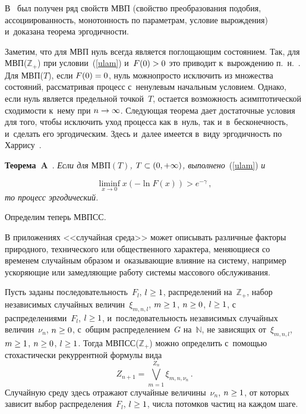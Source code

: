\begin{multicols}{2}
В~\cite{Leb-2005d} был получен ряд свойств МВП (свойство преобразования подобия,
ассоциированность, монотонность по па\-ра\-мет\-рам, условие вырождения)
и~доказана тео\-ре\-ма эргодичности.

Заметим, что для МВП нуль всегда является
по\-гло\-ща\-ющим со\-сто\-яни\-ем. Так, для МВП($\mathbb{Z}_+$) 
при условии~(\ref{ulam})
и~$F(0)\hm>0$ это приводит к~вы\-рож\-де\-нию п.~н.~\cite{Lamp1}. Для МВП($T$), если 
$F(0)\hm=0$,
нуль можно\linebreak просто исключить из множества со\-сто\-яний, рас\-смат\-ри\-вая процесс 
с~ненулевым начальным условием. Однако, если нуль является предельной\linebreak
 точ\-кой~$T$,
остается воз\-мож\-ность асимптотической схо\-ди\-мости к~нему при $n\hm\to\infty$.
Следующая тео\-ре\-ма дает достаточные условия для того, чтобы исключить уход
процесса как в~нуль, так и~в~бес\-ко\-неч\-ность, и~сделать его эргодическим.
Здесь и~далее имеется в~виду эр\-го\-дич\-ность по Харрису~\cite[гл. 1]{Borov}.

\smallskip

\noindent
\textbf{Теорема~A}~\cite[теорема 1]{Leb-2005d}. 
\textit{Если для $\mathrm{МВП}(T)$, $T\hm\subset (0,+\infty)$,
выполнено}~(\ref{ulam}) \textit{и}

\noindent
$$
\liminf\limits_{x\to 0}x(-\ln F(x))>e^{-\gamma}\,,
$$
\textit{то процесс эргодический.}

\columnbreak


Определим теперь МВПСС.

В приложениях <<случайная среда>> может описывать различные 
факторы природного, технического
или общественного характера, ме\-ня\-ющи\-еся со временем случайным 
образом и~ока\-зы\-ва\-ющие влияние
на сис\-те\-му, например уско\-ря\-ющие или за\-мед\-ля\-ющие работу 
сис\-те\-мы массового об\-слу\-жи\-ва\-ния.

Пусть заданы последовательность~$F_l$, $l\hm\ge 1$, распределений на~$\mathbb{Z}_+$,
набор независимых случайных величин~$\xi_{m,n,l}$, $m\hm\ge 1$, $n\hm\ge 0$, $l\hm\ge 1$,
с распределениями~$F_l$, $l\hm\ge 1$, и~по\-сле\-до\-ва\-тель\-ность независимых случайных 
величин~$\nu_n$, $n\hm\ge 0$, с~общим распределением~$G$ на~$\mathbb{N}$, не зависящих 
от~$\xi_{m,n,l}$, $m\hm\ge 1$, $n\hm\ge 0$, $l\hm\ge 1$. Тогда МВПСС($\mathbb{Z}_+$) 
можно определить
с~по\-мощью стохастически рекуррентной формулы вида
\begin{equation}
\label{f1-41-mvpss}
Z_{n+1}=\bigvee\limits_{m=1}^{Z_n}\xi_{m,n,\nu_n}\,.
\end{equation}
Случайную среду здесь отражают случайные величины~$\nu_n$, $n\hm\ge 1$, 
от которых зависит
выбор распределения~$F_l$, $l\hm\ge 1$, чис\-ла по\-том\-ков час\-тиц на каж\-дом шаге.


\end{multicols}
